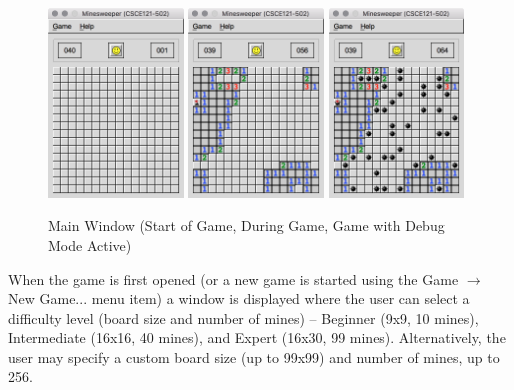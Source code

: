 \documentclass[11pt]{article}
\begin{document}
\begin{figure}[htbp]
   \centering
   \includegraphics[width=0.32\textwidth]{main.png}
   \includegraphics[width=0.32\textwidth]{mainProgress.png}
   \includegraphics[width=0.32\textwidth]{mainProgressDebug.png}
   \caption{Main Window (Start of Game, During Game, Game with Debug Mode Active)}
\end{figure}

When the game is first opened (or a new game is started using the Game $\rightarrow$ New Game... menu item) a window is displayed where the user can select a difficulty level (board size and number of mines) -- Beginner (9x9, 10 mines), Intermediate (16x16, 40 mines), and Expert (16x30, 99 mines). Alternatively, the user may specify a custom board size (up to 99x99) and number of mines, up to 256.
\end{document}
